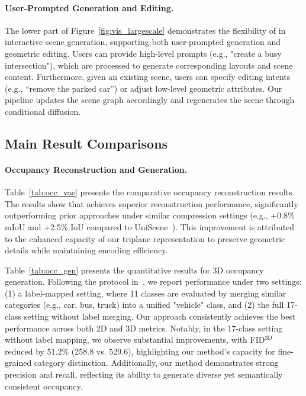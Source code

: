 



\paragraph{User-Prompted Generation and Editing.}
The lower part of Figure~\ref{fig:vis_largescale} demonstrates the flexibility of {\method} in interactive scene generation, supporting both user-prompted generation and geometric editing. Users can provide high-level prompts (e.g., "create a busy intersection"), which are processed to generate corresponding layouts and scene content. Furthermore, given an existing scene, users can specify editing intents (e.g., “remove the parked car”) or adjust low-level geometric attributes. Our pipeline updates the scene graph accordingly and regenerates the scene through conditional diffusion.


\subsection{Main Result Comparisons}
\paragraph{Occupancy Reconstruction and Generation.}
Table~\ref{tab:occ_vae} presents the comparative occupancy reconstruction results. 
The results show that {\method} achieves superior reconstruction performance, significantly outperforming prior approaches under similar compression settings (e.g., +0.8\% mIoU and +2.5\% IoU compared to UniScene~\cite{UniScene}). This improvement is attributed to the enhanced capacity of our triplane representation to preserve geometric details while maintaining encoding efficiency.

Table~\ref{tab:occ_gen} presents the quantitative results for 3D occupancy generation. Following the protocol in~\cite{DynamicCity}, we report performance under two settings: (1) a label-mapped setting, where 11 classes are evaluated by merging similar categories (e.g., car, bus, truck) into a unified "vehicle" class, and (2) the full 17-class setting without label merging.
Our approach consistently achieves the best performance across both 2D and 3D metrics. Notably, in the 17-class setting without label mapping, we observe substantial improvements, with FID$^\text{3D}$ reduced by 51.2\% (258.8 vs. 529.6), highlighting our method’s capacity for fine-grained category distinction. Additionally, our method demonstrates strong precision and recall, reflecting its ability to generate diverse yet semantically consistent occupancy.

